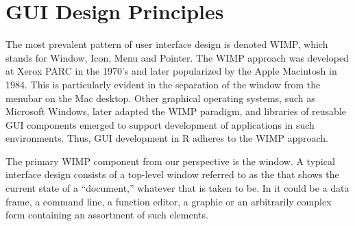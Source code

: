 \section{GUI Design Principles}
\label{sec:GUI:design}








The most prevalent pattern of user interface design is denoted WIMP,
which stands for Window, Icon, Menu and Pointer. The
WIMP approach was developed at Xerox PARC in the 1970's and later
popularized by the Apple Macintosh in 1984. This is particularly
evident in the separation of the window from the menubar on the Mac
desktop. Other graphical operating systems, such as Microsoft Windows,
later adapted the WIMP paradigm, and libraries of reusable GUI
components emerged to support development of applications in such
environments. Thus, GUI development in R adheres to the WIMP approach.

The primary WIMP component from our perspective is the window. A
typical interface design consists of a top-level window referred to as
the  that shows the current state of a
``document,'' whatever that is taken to be. In \R\/ it could be a data
frame, a command line, a function editor, a graphic or an arbitrarily
complex form containing an assortment of such elements. 



